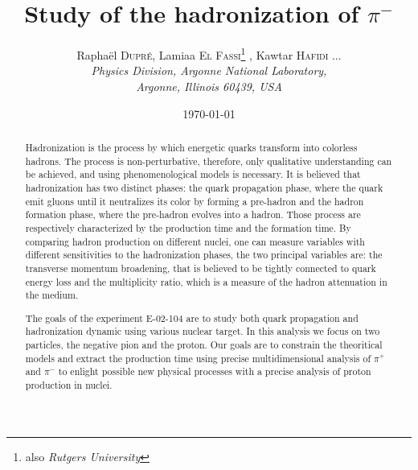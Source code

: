 \documentclass[a4paper,12pt,twoside]{article}
\title{Study of the hadronization of $\pi^-$}
\author{Rapha\"el \textsc{Dupr\'e}, 
Lamiaa \textsc{El Fassi}\thanks{also {\it Rutgers University}} , 
Kawtar \textsc{Hafidi} ... \\ 
{\it Physics Division, Argonne National Laboratory,} \\
{\it Argonne, Illinois 60439, USA} }
\date{\today}
\begin{document}
\maketitle

\renewcommand{\baselinestretch}{1.10}

\begin{abstract}
Hadronization is the process by which energetic quarks transform into 
colorless hadrons. The process is non-perturbative, therefore, only 
qualitative understanding can be achieved, and using phenomenological models 
is necessary. It is believed that hadronization has two distinct phases: 
the quark propagation phase, where the quark emit gluons until it neutralizes 
its color by forming a pre-hadron and the hadron formation phase, where the 
pre-hadron evolves into a hadron. Those process are respectively characterized 
by the production time and the formation time. By comparing hadron production 
on different nuclei, one can measure variables with different sensitivities 
to the hadronization phases, the two principal variables are: the transverse 
momentum broadening, that is believed to be tightly connected to quark energy 
loss and the multiplicity ratio, which is a measure of the hadron attenuation 
in the medium.

The goals of the experiment E-02-104 are to study both quark propagation
and hadronization dynamic using various nuclear target.
In this analysis we focus on two particles, the negative pion and the proton.
Our goals are to constrain the theoritical models and extract the production
time using precise multidimensional analysis of $\pi^+$ and $\pi^-$ to enlight possible
new physical processes with a precise analysis of proton production in nuclei.

\end{abstract}

\newpage

\tableofcontents

\newpage









\end{document}

